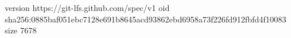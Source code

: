 version https://git-lfs.github.com/spec/v1
oid sha256:0885baf051ebc7128e691b8645acd93862ebd6958a73f226fd912fbfd4f10083
size 7678
